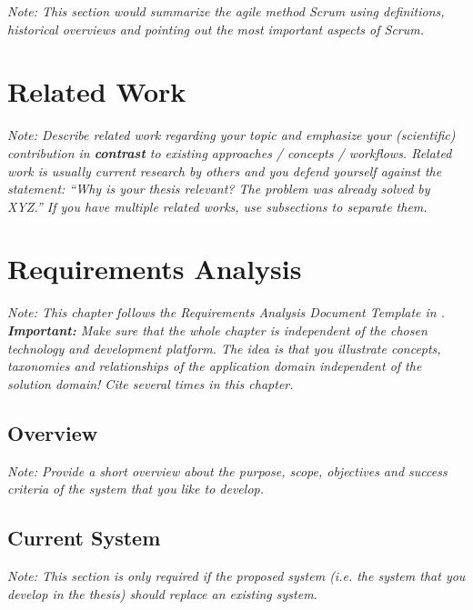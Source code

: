 \documentclass[a4paper,12pt,twoside]{report}
\begin{document}
\textit{Note: This section would summarize the agile method Scrum using definitions, historical overviews and pointing out the most important aspects of Scrum.}




\chapter{Related Work}

\textit{Note: Describe related work regarding your topic and emphasize your (scientific) contribution in \textbf{contrast} to existing approaches / concepts / workflows. Related work is usually current research by others and you defend yourself against the statement: ``Why is your thesis relevant? The problem was already solved by XYZ.'' If you have multiple related works, use subsections to separate them.}





\chapter{Requirements Analysis}

\textit{Note: This chapter follows the Requirements Analysis Document Template in \cite{bruegge2004object}.
	\textbf{Important:} Make sure that the whole chapter is independent of the chosen technology and development platform. The idea is that you illustrate concepts, taxonomies and relationships of the application domain independent of the solution domain!
	Cite \cite{bruegge2004object} several times in this chapter.}

\section{Overview}

\textit{Note: Provide a short overview about the purpose, scope, objectives and success criteria of the system that you like to develop.}

\section{Current System}

\textit{Note: This section is only required if the proposed system (i.e. the system that you develop in the thesis) should replace an existing system.}
\end{document}
